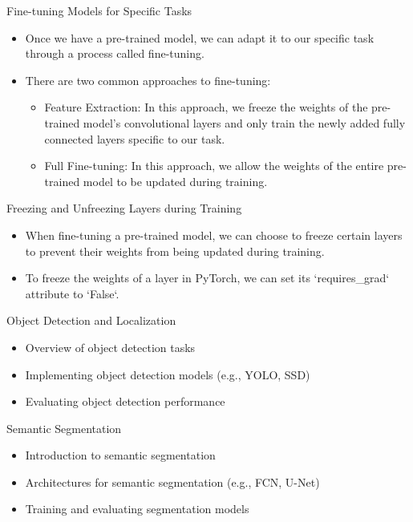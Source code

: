 \documentclass{beamer}
\begin{document}
\begin{frame}{Fine-tuning Models for Specific Tasks}
\begin{itemize}
    \item Once we have a pre-trained model, we can adapt it to our specific task through a process called fine-tuning.
    \item There are two common approaches to fine-tuning:
        \begin{itemize}
            \item Feature Extraction: In this approach, we freeze the weights of the pre-trained model's convolutional layers and only train the newly added fully connected layers specific to our task.
            \item Full Fine-tuning: In this approach, we allow the weights of the entire pre-trained model to be updated during training. 
        \end{itemize}
\end{itemize}
\end{frame}

\begin{frame}{Freezing and Unfreezing Layers during Training}
\begin{itemize}
    \item When fine-tuning a pre-trained model, we can choose to freeze certain layers to prevent their weights from being updated during training. 
    \item To freeze the weights of a layer in PyTorch, we can set its `requires_grad` attribute to `False`.
\end{itemize}
\end{frame}

\begin{frame}{Object Detection and Localization}
\begin{itemize}
    \item Overview of object detection tasks
    \item Implementing object detection models (e.g., YOLO, SSD)
    \item Evaluating object detection performance
\end{itemize}
\end{frame}

\begin{frame}{Semantic Segmentation}
\begin{itemize}
    \item Introduction to semantic segmentation
    \item Architectures for semantic segmentation (e.g., FCN, U-Net)
    \item Training and evaluating segmentation models
\end{itemize}
\end{frame}
\end{document}
